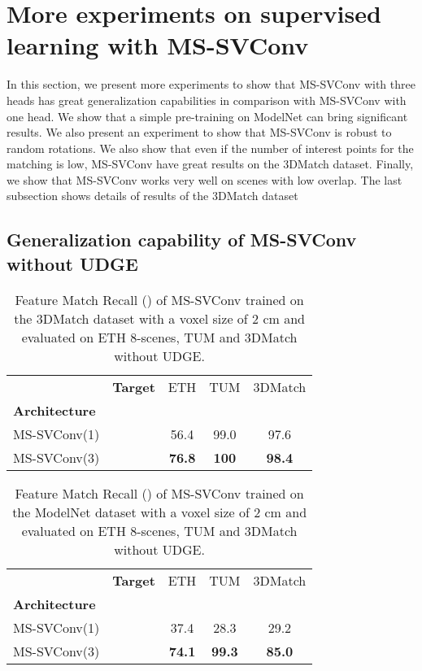 \documentclass[10pt,twocolumn,letterpaper]{article}
\begin{document}
\section{More experiments on supervised learning with MS-SVConv}
In this section, we present more experiments to show that MS-SVConv with three heads has great generalization capabilities in comparison with MS-SVConv with one head. We show that a simple pre-training on ModelNet can bring significant results. We also present an experiment to show that MS-SVConv is robust to random rotations. We also show that even if the number of interest points for the matching is low, MS-SVConv have great results on the 3DMatch dataset. Finally, we show that MS-SVConv works very well on scenes with low overlap. The last subsection shows details of results of the 3DMatch dataset

\subsection{Generalization capability of MS-SVConv without UDGE}


\begin{table}[ht]
\small
\centering
\begin{tabular}[t]{llccc}
\toprule
& \textbf{Target} & ETH & TUM & 3DMatch \\
\textbf{Architecture} & &  &  &  \\
\midrule
MS-SVConv(1) & & 56.4 &99.0 & 97.6 \\
MS-SVConv(3) & & \bf{76.8} & \bf{100} & \bf{98.4} \\
\bottomrule
\end{tabular}
\caption{Feature Match Recall () of MS-SVConv trained on the 3DMatch dataset with a voxel size of 2 cm and evaluated on ETH 8-scenes, TUM and 3DMatch without UDGE.}
\label{tab:transfer4}
\end{table}

\begin{table}[ht]
\small
\centering
\begin{tabular}[t]{llccc}
\toprule
& \textbf{Target} & ETH & TUM & 3DMatch \\
\textbf{Architecture} & &  &  &  \\
\midrule
MS-SVConv(1) & & 37.4 &28.3 & 29.2 \\
MS-SVConv(3) & & \bf{74.1} & \bf{99.3} & \bf{85.0} \\
\bottomrule
\end{tabular}
\caption{Feature Match Recall () of MS-SVConv trained on the ModelNet dataset with a voxel size of 2 cm and evaluated on ETH 8-scenes, TUM and 3DMatch without UDGE.}
\label{tab:transfer3}
\end{table}
\end{document}

